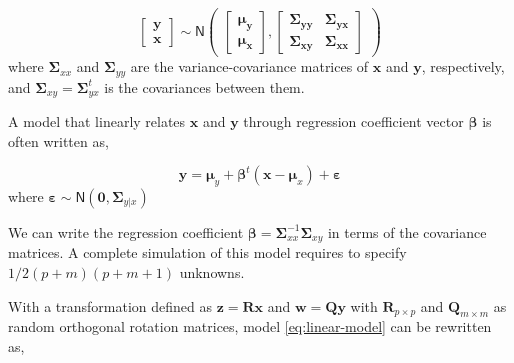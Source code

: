 \documentclass[11pt,twoside,openright,titlepage,
  headinclude,footinclude,BCOR=5mm,
  numbers=noenddot,cleardoublepage=empty,
  tablecaptionabove, dottedtoc,
  bibliography=totoc,paper=a4]{scrreprt}
\begin{document}
\begin{equation}
\begin{bmatrix}
  \mathbf{y}\\
  \mathbf{x}
\end{bmatrix} \sim
\mathsf{N}
\begin{pmatrix}
  \begin{bmatrix}
    \boldsymbol{\mu_y}\\
    \boldsymbol{\mu_x}
  \end{bmatrix},
  \begin{bmatrix}
    \boldsymbol{\Sigma_{yy}} & \boldsymbol{\Sigma_{yx}} \\
    \boldsymbol{\Sigma_{xy}} & \boldsymbol{\Sigma_{xx}}
  \end{bmatrix}
\end{pmatrix}
\label{eq:linear-model}
\end{equation}
where \(\boldsymbol{\Sigma}_{xx}\) and \(\boldsymbol{\Sigma}_{yy}\) are the variance-covariance matrices of \(\mathbf{x}\) and \(\mathbf{y}\), respectively, and \(\boldsymbol{\Sigma}_{xy} = \boldsymbol{\Sigma}_{yx}^t\) is the covariances between them.

A model that linearly relates \(\mathbf{x}\) and \(\mathbf{y}\) through regression coefficient vector \(\boldsymbol{\beta}\) is often written as,

\begin{equation}
\mathbf{y} = \boldsymbol{\mu}_y + \boldsymbol{\beta}^t\left(\mathbf{x} - \boldsymbol{\mu}_x\right) + \boldsymbol{\varepsilon}
\label{eq:linear-reg-model}
\end{equation}
where \(\boldsymbol{\varepsilon} \sim \textsf{N}\left(\mathbf{0}, \boldsymbol{\Sigma}_{y|x}\right)\)

We can write the regression coefficient \(\boldsymbol{\beta} = \boldsymbol{\Sigma}_{xx}^{-1}\boldsymbol{\Sigma}_{xy}\) in terms of the covariance matrices. A complete simulation of this model requires to specify \(1/2(p+m)(p+m+1)\) unknowns.

With a transformation defined as \(\mathbf{z} = \mathbf{Rx}\) and \(\mathbf{w} = \mathbf{Qy}\) with \(\mathbf{R}_{p\times p}\) and \(\mathbf{Q}_{m\times m}\) as random orthogonal rotation matrices, model \eqref{eq:linear-model} can be rewritten as,
\end{document}
